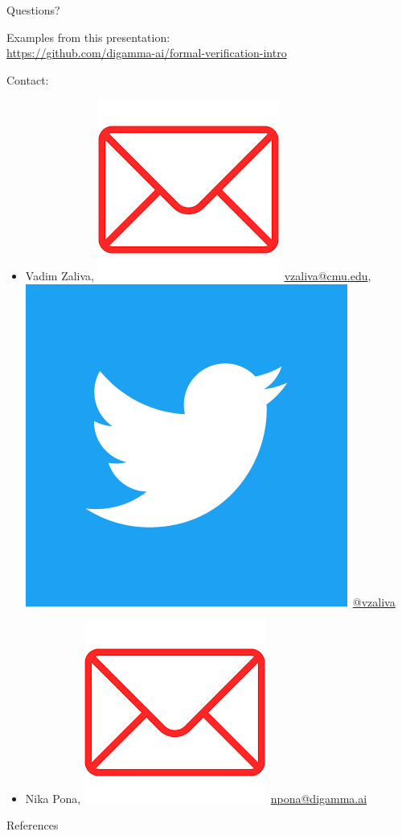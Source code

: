 \documentclass[10pt,usenames,dvipsnames,landscape]{beamer}
\begin{document}
\begin{frame}{Questions?}

Examples from this presentation: \\ {\small\url{https://github.com/digamma-ai/formal-verification-intro}}

\vspace*{2\baselineskip}

Contact: 
\begin{itemize}
    \item Vadim Zaliva, \includegraphics[height=\fontcharht\font`\B]{email.png}\ \href{mailto:vzaliva@cmu.edu}{vzaliva@cmu.edu}, \includegraphics[height=\fontcharht\font`\B]{Twitter_Social_Icon_Square_Color.png}\ \href{https://twitter.com/vzaliva}{@vzaliva}
    \item Nika Pona, \includegraphics[height=\fontcharht\font`\B]{email.png}\ \href{mailto:npona@digamma.ai}{npona@digamma.ai}
\end{itemize}




\end{frame}
    
\begin{frame}[allowframebreaks]{References}

  
  

\end{frame}
\end{document}
